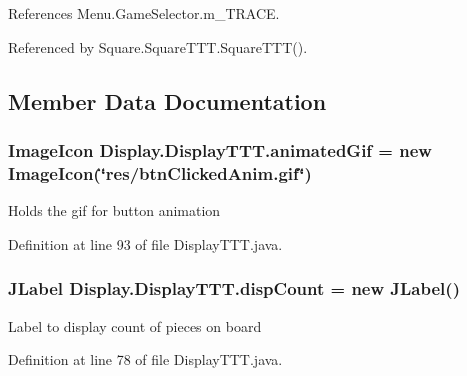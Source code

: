 References Menu.\+Game\+Selector.\+m\+\_\+\+T\+R\+A\+C\+E.



Referenced by Square.\+Square\+T\+T\+T.\+Square\+T\+T\+T().



\subsection{Member Data Documentation}
\hypertarget{class_display_1_1_display_t_t_t_a6ff178cba82943d451e39c7c6b577f83}{}
\subsubsection[{animated\+Gif}]{\setlength{\rightskip}{0pt plus 5cm}Image\+Icon Display.\+Display\+T\+T\+T.\+animated\+Gif = new Image\+Icon(\char`\"{}res/btn\+Clicked\+Anim.\+gif\char`\"{})\hspace{0.3cm}{\ttfamily [private]}}\label{class_display_1_1_display_t_t_t_a6ff178cba82943d451e39c7c6b577f83}
Holds the gif for button animation 

Definition at line 93 of file Display\+T\+T\+T.\+java.

\hypertarget{class_display_1_1_display_t_t_t_afbec846dfebaa4c2640cd270ec21c8b9}{}
\subsubsection[{disp\+Count}]{\setlength{\rightskip}{0pt plus 5cm}J\+Label Display.\+Display\+T\+T\+T.\+disp\+Count = new J\+Label()\hspace{0.3cm}{\ttfamily [private]}}\label{class_display_1_1_display_t_t_t_afbec846dfebaa4c2640cd270ec21c8b9}
Label to display count of pieces on board 

Definition at line 78 of file Display\+T\+T\+T.\+java.

\hypertarget{class_display_1_1_display_t_t_t_a2f2eeba39f4aa0dcc00ef6b72e2b6c66}{}
